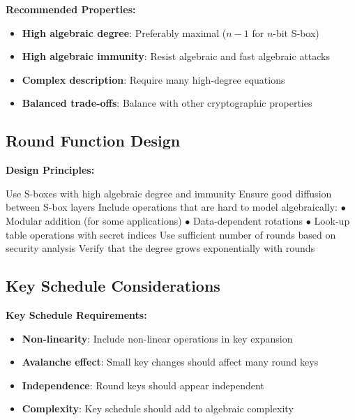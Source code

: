 \documentclass[12pt,a4paper]{article}
\begin{document}
\begin{defenseBox}[title=S-box Design Guidelines]
\textbf{Recommended Properties:}
\begin{itemize}
    \item \textbf{High algebraic degree}: Preferably maximal ($n-1$ for $n$-bit S-box)
    \item \textbf{High algebraic immunity}: Resist algebraic and fast algebraic attacks
    \item \textbf{Complex description}: Require many high-degree equations
    \item \textbf{Balanced trade-offs}: Balance with other cryptographic properties
\end{itemize}
\end{defenseBox}

\subsection{Round Function Design}

\begin{algorithmbox}[title=Algebraically Secure Round Function]
\textbf{Design Principles:}
\begin{algorithmic}[1]
\STATE Use S-boxes with high algebraic degree and immunity
\STATE Ensure good diffusion between S-box layers
\STATE Include operations that are hard to model algebraically:
\STATE \quad $\bullet$ Modular addition (for some applications)
\STATE \quad $\bullet$ Data-dependent rotations
\STATE \quad $\bullet$ Look-up table operations with secret indices
\STATE Use sufficient number of rounds based on security analysis
\STATE Verify that the degree grows exponentially with rounds
\end{algorithmic}
\end{algorithmbox}

\subsection{Key Schedule Considerations}

\begin{defenseBox}[title=Key Schedule Security]
\textbf{Key Schedule Requirements:}
\begin{itemize}
    \item \textbf{Non-linearity}: Include non-linear operations in key expansion
    \item \textbf{Avalanche effect}: Small key changes should affect many round keys
    \item \textbf{Independence}: Round keys should appear independent
    \item \textbf{Complexity}: Key schedule should add to algebraic complexity
\end{itemize}
\end{defenseBox}
\end{document}

